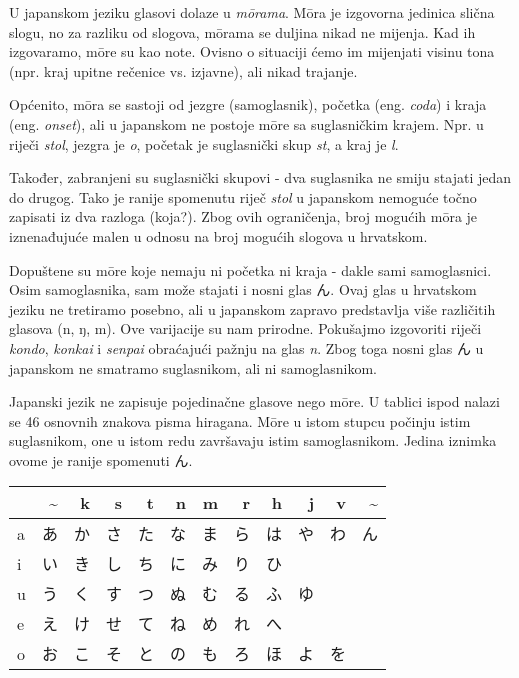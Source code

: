 
\author{autor}

	
	
	U japanskom jeziku glasovi dolaze u \textit{m\={o}rama}. M\={o}ra je izgovorna jedinica slična slogu, no za razliku od slogova, m\={o}rama se duljina nikad ne mijenja. Kad ih izgovaramo, m\={o}re su kao note. Ovisno o situaciji ćemo im mijenjati visinu tona (npr. kraj upitne rečenice vs. izjavne), ali nikad trajanje.
	
	Općenito, m\={o}ra se sastoji od jezgre (samoglasnik), početka (eng. \textit{coda}) i kraja (eng. \textit{onset}), ali u japanskom ne postoje m\={o}re sa suglasničkim krajem. Npr. u riječi \textit{stol}, jezgra je \textit{o}, početak je suglasnički skup \textit{st}, a kraj je \textit{l}.
	
	Također, zabranjeni su suglasnički skupovi - dva suglasnika ne smiju stajati jedan do drugog. Tako je ranije spomenutu riječ \textit{stol} u japanskom nemoguće točno zapisati iz dva razloga (koja?). Zbog ovih ograničenja, broj mogućih m\={o}ra je iznenađujuće malen u odnosu na broj mogućih slogova u hrvatskom.
	
	Dopuštene su m\={o}re koje nemaju ni početka ni kraja - dakle sami samoglasnici. Osim samoglasnika, sam može stajati i nosni glas ん. Ovaj glas u hrvatskom jeziku ne tretiramo posebno, ali u japanskom zapravo predstavlja više različitih glasova (n, ŋ, m). Ove varijacije su nam prirodne. Pokušajmo izgovoriti riječi \textit{kondo}, \textit{konkai} i \textit{senpai} obraćajući pažnju na glas \textit{n}. Zbog toga nosni glas ん u japanskom ne smatramo suglasnikom, ali ni samoglasnikom.
	
	
	Japanski jezik ne zapisuje pojedinačne glasove nego m\={o}re. U tablici ispod nalazi se 46 osnovnih znakova pisma hiragana. M\={o}re u istom stupcu počinju istim suglasnikom, one u istom redu završavaju istim samoglasnikom. Jedina iznimka ovome je ranije spomenuti ん.
	
	\vspace{10pt}
	\begin{tabular}{|l|r|r|r|r|r|r|r|r|r|r|r|}
		\hline
		&\textasciitilde&k&s&t&n&m&r&h&j&v&\textasciitilde\\
		\hline
		a&あ&か&さ&た&な&ま&ら&は&や&わ&ん\\
		i&い&き&し&ち&に&み&り&ひ&&&\\
		u&う&く&す&つ&ぬ&む&る&ふ&ゆ&&\\
		e&え&け&せ&て&ね&め&れ&へ&&&\\
		o&お&こ&そ&と&の&も&ろ&ほ&よ&を&\\
		\hline
	\end{tabular}
	

